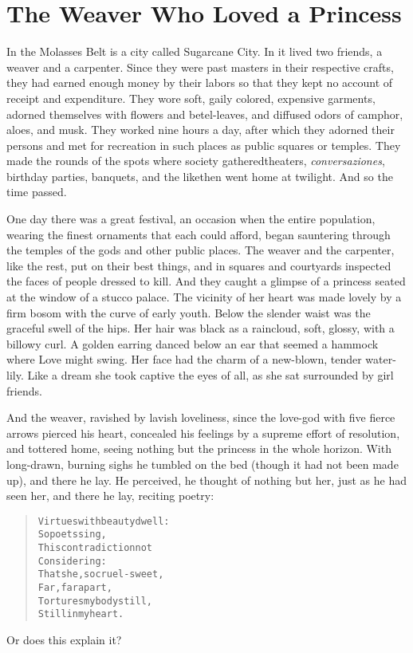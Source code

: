 \documentclass[article, twoside, 14pt]{memoir}
\renewenvironment{verbatim}{%
\begin{quote}%
\vskip -10pt%
\begin{alltt}\normalfont\large}{\end{alltt}%
\end{quote}%
\vskip -10pt
} %
\begin{document}
\chapter{The Weaver Who Loved a Princess}

\label{s11}

In the Molasses Belt is a city called Sugarcane City. In it
lived two friends, a weaver and a carpenter. Since they were past
masters in their respective crafts, they had earned enough money by
their labors so that they kept no account of receipt and
expenditure. They wore soft, gaily colored, expensive garments,
adorned themselves with flowers and betel-leaves, and diffused
odors of camphor, aloes, and musk. They worked nine hours a day,
after which they adorned their persons and met for recreation in
such places as public squares or temples. They made the rounds of
the spots where society gathered{\textemdash}theaters, \emph{conversaziones},
birthday parties, banquets, and the like{\textemdash}then went home at
twilight. And so the time passed.

One day there was a great festival, an occasion when the entire
population, wearing the finest ornaments that each could afford,
began sauntering through the temples of the gods and other public
places. The weaver and the carpenter, like the rest, put on their
best things, and in squares and courtyards inspected the faces of
people dressed to kill. And they caught a glimpse of a princess
seated at the window of a stucco palace. The vicinity of her heart
was made lovely by a firm bosom with the curve of early youth.
Below the slender waist was the graceful swell of the hips. Her
hair was black as a raincloud, soft, glossy, with a billowy curl. A
golden earring danced below an ear that seemed a hammock where Love
might swing. Her face had the charm of a new-blown, tender
water-lily. Like a dream she took captive the eyes of all, as she
sat surrounded by girl friends.

And the weaver, ravished by lavish loveliness, since the love-god
with five fierce arrows pierced his heart, concealed his feelings
by a supreme effort of resolution, and tottered home, seeing
nothing but the princess in the whole horizon. With long-drawn,
 burning sighs he tumbled on the bed (though it had not been
made up), and there he lay. He perceived, he thought of nothing but
her, just as he had seen her, and there he lay, reciting poetry:

\begin{verbatim}
Virtues with beauty dwell:
    So poets sing,
This contradiction not
    Considering:
That she, so cruel-sweet,
    Far, far apart,
Tortures my body still,
    Still in my heart.
\end{verbatim}
Or does this explain it?
\end{document}
